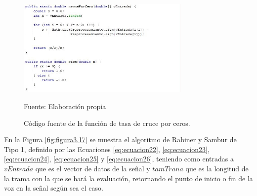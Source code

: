 \begin{enumerate}
\begin{figure}[H]
\captionsetup{justification=centering}
\begin{center}
\includegraphics[width=0.75\textwidth]{Imagenes/Cap3/image014}
\end{center}
\begin{center}
\vskip -0.5cm
\caption{\small{Código fuente de la función de tasa de cruce por ceros.}}
\label{fig:figura3.14}
{\small{Fuente: Elaboración propia}}
\end{center}
\end{figure}
\vskip -0.5cm
En la Figura \ref{fig:figura3.17} se muestra el algoritmo de Rabiner y Sambur de Tipo 1, definido por las Ecuaciones \eqref{eq:ecuacion22}, \eqref{eq:ecuacion23}, \eqref{eq:ecuacion24}, \eqref{eq:ecuacion25} y \eqref{eq:ecuacion26}, teniendo como entradas a $vEntrada$ que es el vector de datos de la señal y $tamTrana$ que es la longitud de la trama con la que se hará la evaluación, retornando el punto de inicio o fin de la voz en la señal según sea el caso.


\end{enumerate}
